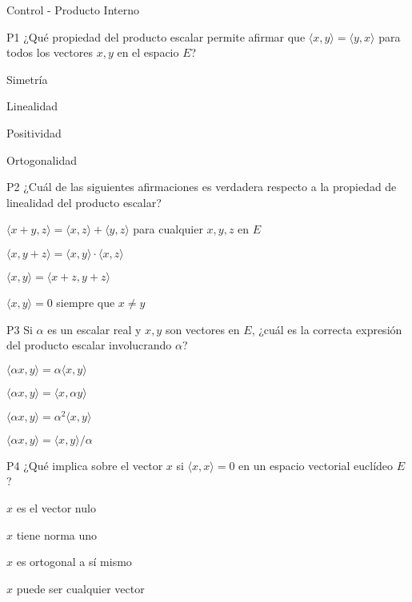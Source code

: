 \documentclass[a4,11pt]{aleph-notas}
\begin{document}
\begin{quiz}{Control - Producto Interno}

\begin{multi}[]%
    {P1}     
    ¿Qué propiedad del producto escalar permite afirmar que \(\langle x,y \rangle = \langle y,x \rangle\) para todos los vectores \(x,y\) en el espacio \(E\)?     
    \item* Simetría     
    \item Linealidad     
    \item Positividad     
    \item Ortogonalidad 
\end{multi}

\begin{multi}[]%
    {P2}     
    ¿Cuál de las siguientes afirmaciones es verdadera respecto a la propiedad de linealidad del producto escalar?     
    \item* \(\langle x + y, z \rangle = \langle x, z \rangle + \langle y, z \rangle\) para cualquier \(x, y, z\) en \(E\)     
    \item \(\langle x, y + z \rangle = \langle x, y \rangle \cdot \langle x, z \rangle\)     
    \item \(\langle x, y \rangle = \langle x + z, y + z \rangle\)     
    \item \(\langle x, y \rangle = 0\) siempre que \(x \neq y\) 
\end{multi}

\begin{multi}[]%
    {P3}     
    Si \(\alpha\) es un escalar real y \(x, y\) son vectores en \(E\), ¿cuál es la correcta expresión del producto escalar involucrando \(\alpha\)?     
    \item* \(\langle \alpha x, y \rangle = \alpha \langle x, y \rangle\)     
    \item \(\langle \alpha x, y \rangle = \langle x, \alpha y \rangle\)     
    \item \(\langle \alpha x, y \rangle = \alpha^2 \langle x, y \rangle\)     
    \item \(\langle \alpha x, y \rangle = \langle x, y \rangle/\alpha\) 
\end{multi}

\begin{multi}[]%
    {P4}     
    ¿Qué implica sobre el vector \(x\) si \(\langle x, x \rangle = 0\) en un espacio vectorial euclídeo \(E\)?     
    \item* \(x\) es el vector nulo     
    \item \(x\) tiene norma uno     
    \item \(x\) es ortogonal a sí mismo     
    \item \(x\) puede ser cualquier vector 
\end{multi}


\end{quiz}
\end{document}
